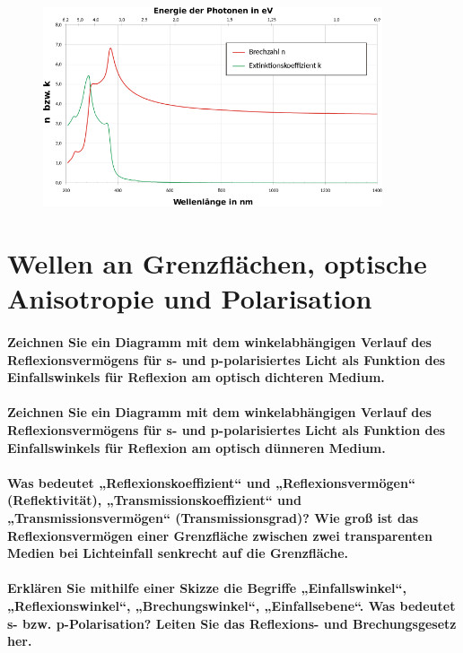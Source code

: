 \documentclass[a4paper, 11pt, parskip=half]{scrartcl}
\begin{document}
\begin{figure}[H]
    \centering
    \includegraphics[width=10cm]{image/14/6}
\end{figure}

\newpage

\section{Wellen an Grenzflächen, optische Anisotropie und Polarisation}

\paragraph{Zeichnen Sie ein Diagramm mit dem winkelabhängigen Verlauf des Reflexionsvermögens für s-
und p-polarisiertes Licht als Funktion des Einfallswinkels für Reflexion am optisch dichteren
Medium.}

\paragraph{Zeichnen Sie ein Diagramm mit dem winkelabhängigen Verlauf des Reflexionsvermögens für s-
und p-polarisiertes Licht als Funktion des Einfallswinkels für Reflexion am optisch dünneren
Medium.}

\paragraph{Was bedeutet „Reflexionskoeffizient“ und „Reflexionsvermögen“ (Reflektivität),
„Transmissionskoeffizient“ und „Transmissionsvermögen“ (Transmissionsgrad)? Wie groß ist das
Reflexionsvermögen einer Grenzfläche zwischen zwei transparenten Medien bei Lichteinfall senkrecht
auf die Grenzfläche.}

\paragraph{Erklären Sie mithilfe einer Skizze die Begriffe „Einfallswinkel“, „Reflexionswinkel“, „Brechungswinkel“, „Einfallsebene“. Was bedeutet s- bzw. p-Polarisation? Leiten Sie das Reflexions-
und Brechungsgesetz her.}
\end{document}
